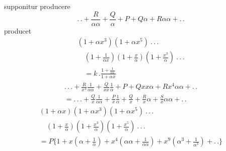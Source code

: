 \noindent supponitur producere
\[
.\,.+\frac{R}{\alpha\alpha}+\frac{Q}{\alpha}+P+Q\alpha+R\alpha\alpha+ .\,.
\]
\noindent producet
\[
\begin{gathered}(1+\alpha x^{3})(1+\alpha x^{5})\ .\,.\,.
\\[7pt]\quad{}(1+\tfrac1{\alpha x})(1+\tfrac{x}{\alpha})(1+\tfrac{x^{3}}{\alpha})\ .\,.\,.
\\[7pt]\quad{}=k\,.\frac{1+\frac1{\alpha x}}{1+\alpha x}\end{gathered}
\]
\[
\begin{gathered}
.\,.\,.+\frac{R}{x^{4}}\frac1{\alpha\alpha}
+\frac{Q}{xx}\frac1\alpha+P+Qxx\alpha+Rx^{4}\alpha\alpha+ .\,.
\\[7pt]
=.\,.\,.+\frac{Q}{x}\frac1{\alpha\alpha}+\frac{P}{x}\frac1\alpha
+\frac{Q}{x}+\frac{R}{x}\alpha+\frac{S}{x}\alpha\alpha+ .\,.
\end{gathered}
\]
\[
\begin{gathered}
(1+\alpha x)(1+\alpha x^{3})(1+\alpha x^{5})\ .\,.\,.
\\[7pt]\quad{}(1+\tfrac{x}{\alpha})(1+\tfrac{x^{3}}{\alpha})(1+\tfrac{x^{5}}{\alpha})\ .\,.\,.
\\[7pt]
=P\{1+x(\alpha+\tfrac1\alpha)
+x^{4}(\alpha\alpha+\tfrac1{\alpha\alpha})
+x^{9}(\alpha^{3}+\tfrac1{\alpha^{3}})+ .\,.\}
\end{gathered}
\]


